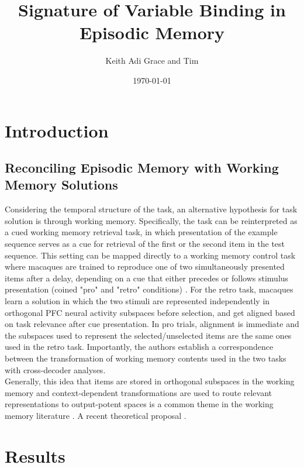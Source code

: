 \documentclass[11pt,a4paper]{article}
\title{Signature of Variable Binding in Episodic Memory}
\author{Keith Adi Grace and Tim}
\date{\today}
\begin{document}
\maketitle
{}

\section{Introduction}%
  \label{sec:Introduction}

\subsection{Reconciling Episodic Memory with Working Memory Solutions}%
  \label{sub:Reconciling Episodic Memory with Working Memory Solutions}

 Considering the temporal structure of the task, an alternative hypothesis for task solution is through working memory. Specifically, the task can be reinterpreted as a cued working memory retrieval task, in which presentation of the example sequence serves as a cue for retrieval of the first or the second item in the test sequence. This setting can be mapped directly to a working memory control task where macaques are trained to reproduce one of two simultaneously presented items after a delay, depending on a cue that either precedes or follows stimulus presentation (coined "pro" and "retro" conditions) \cite{panichelloSmucwma2021}. For the retro task, macaques learn a solution in which the two stimuli are represented independently in orthogonal PFC neural activity subspaces before selection, and get aligned based on task relevance after cue presentation. In pro trials, alignment is immediate and the subspaces used to represent the selected/unselected items are the same ones used in the retro task. Importantly, the authors establish a correspondence between the transformation of working memory contents used in the two tasks with cross-decoder analyses\cite{panichelloSmucwma2021}. \\

 Generally, this idea that items are stored in orthogonal subspaces in the working memory and context-dependent transformations are used to route relevant representations to output-potent spaces is a common theme in the working memory literature \cite{xieGswmmpc2022,libbyRdrismr2021,liFULRSWMMPC2025,panichelloSmucwma2021}. A recent theoretical proposal \cite{whittingtonttaSsepsmauhcm2025}.

\section{Results}%
  \label{sec:Results}
\end{document}
